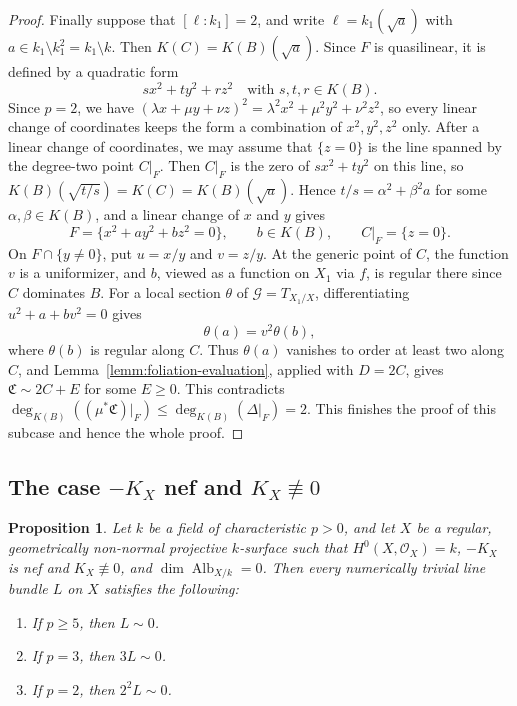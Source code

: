 \documentclass[10pt,abstract=true]{scrartcl}
\numberwithin{equation}{section}
\newtheorem{proposition}[theorem]{Proposition}
\theoremstyle{definition}
\theoremstyle{remark}
\DeclareMathOperator\Alb{Alb}
\begin{document}
\begin{proof}
  Finally suppose that $[\ell:k_1]=2$, and write $\ell=k_1(\sqrt a)$ with $a\in k_1\setminus k_1^2=k_1\setminus k$.
  Then $K(C)=K(B)(\sqrt a)$.
  Since $F$ is quasilinear, it is defined by a quadratic form
  \[
    sx^2+ty^2+rz^2 \quad\text{with }s,t,r\in K(B).
  \]
  Since $p=2$, we have $(\lambda x+\mu y+\nu z)^2=\lambda^2x^2+\mu^2y^2+\nu^2z^2$, so every linear change of coordinates keeps the form a combination of $x^2,y^2,z^2$ only.
  After a linear change of coordinates, we may assume that $\{z=0\}$ is the line spanned by the degree-two point $C|_F$.
  Then $C|_F$ is the zero of $sx^2+ty^2$ on this line, so $K(B)(\sqrt{t/s})=K(C)=K(B)(\sqrt a)$.
  Hence $t/s=\alpha^2+\beta^2a$ for some $\alpha,\beta\in K(B)$, and a linear change of $x$ and $y$ gives
  \[
    F=\{x^2+ay^2+bz^2=0\},\qquad b\in K(B),\qquad C|_F=\{z=0\}.
  \]
  On $F\cap\{y\ne0\}$, put $u=x/y$ and $v=z/y$.
  At the generic point of $C$, the function $v$ is a uniformizer, and $b$, viewed as a function on $X_1$ via $f$, is regular there since $C$ dominates $B$.
  For a local section $\theta$ of $\mathscr G=T_{X_1/X}$, differentiating $u^2+a+bv^2=0$ gives
  \begin{equation}\label{eq:caseC-p2-theta}
    \theta(a)=v^2\theta(b),
  \end{equation}
  where $\theta(b)$ is regular along $C$.
  Thus $\theta(a)$ vanishes to order at least two along $C$, and Lemma~\ref{lemm:foliation-evaluation}, applied with $D=2C$, gives $\mathfrak C\sim2C+E$ for some $E\geq0$.
  This contradicts $\deg_{K(B)}((\mu^*\mathfrak C)|_F)\leq\deg_{K(B)}(\Delta|_F)=2$.
  This finishes the proof of this subcase and hence the whole proof.
\end{proof}

\subsection{The case \texorpdfstring{$-K_X$ nef and $K_X\not\equiv0$}{-K\_X nef and K\_X numerically nontrivial}}\label{sec:caseC-nef-nontrivial}
\begin{proposition}\label{prop:Alb-trivial-nef}
  Let $k$ be a field of characteristic $p > 0$, and let $X$ be a regular, geometrically non-normal projective $k$-surface such that $H^0(X,\mathcal O_X) = k$, $-K_X$ is nef and $K_X\not\equiv0$, and $\dim \Alb_{X/k} = 0$.
  Then every numerically trivial line bundle $L$ on $X$ satisfies the following:
  \begin{enumerate}[label=\textup{(\arabic*)}]
    \item If $p \ge 5$, then $L \sim 0$.
    \item If $p = 3$, then $3L \sim 0$.
    \item If $p = 2$, then $2^2L \sim 0$.
  \end{enumerate}
\end{proposition}
\end{document}
